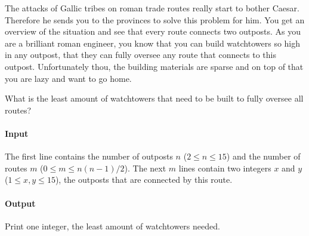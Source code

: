 




The attacks of Gallic tribes on roman trade routes really start to bother Caesar. Therefore he sends you to the provinces to solve this problem for him. You get an overview of the situation and see that every route connects two outposts. As you are a brilliant roman engineer, you know that you can build watchtowers so high in any outpost, that they can fully oversee any route that connects to this outpost. Unfortunately thou, the building materials are sparse and on top of that you are lazy and want to go home.

What is the least amount of watchtowers that need to be built to fully oversee all routes?

\paragraph*{Input}

The first line contains the number of outposts $n$ ($ 2 \leq n \leq 15$) and the number of routes $m$ ($ 0 \leq m \leq n(n-1)/2$). The next $m$ lines contain two integers $x$ and $y$ ($ 1 \leq x,y \leq 15$), the outposts that are connected by this route.

\paragraph*{Output}

Print one integer, the least amount of watchtowers needed.

\begin{samples}
\end{samples}


